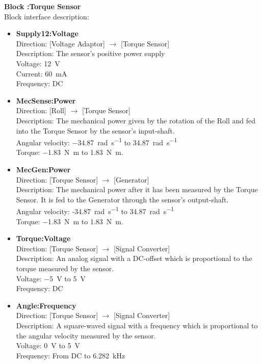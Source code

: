 \newpage
\textbf{Block :Torque Sensor}\\
Block interface description:
\begin{itemize}
	\item \textbf{Supply12:Voltage}\\
	Direction: [Voltage Adaptor] $\rightarrow$ [Torque Sensor]\\
	Description: The sensor's positive power supply\\
	Voltage: \SI{12}{\volt}\\
	Current: \SI{60}{\milli \ampere}\\
	Frequency: DC
	\item \textbf{MecSense:Power}\\
	Direction: [Roll] $\rightarrow$ [Torque Sensor]\\
	Description: The mechanical power given by the rotation of the Roll and fed into the Torque Sensor by the sensor's input-shaft.\\
	Angular velocity: \SI{-34.87}{\radian \per \second} to \SI{34.87}{\radian \per \second}\\
	Torque: \SI{-1.83}{\newton \meter} to \SI{1.83}{\newton \meter}.
	\item \textbf{MecGen:Power}\\
	Direction: [Torque Sensor] $\rightarrow$ [Generator]\\
	Description: The mechanical power after it has been measured by the Torque Sensor. It is fed to the Generator through the sensor's output-shaft.\\
	Angular velocity: -\SI{34.87}{\radian \per \second} to \SI{34.87}{\radian \per \second}\\
	Torque: \SI{-1.83}{\newton \meter} to \SI{1.83}{\newton \meter}.
	\item \textbf{Torque:Voltage}\\
	Direction: [Torque Sensor] $\rightarrow$ [Signal Converter]\\
	Description: An analog signal with a DC-offset which is proportional to the torque measured by the sensor.\\
	Voltage: \SI{-5}{\volt} to \SI{5}{\volt}\\
	Frequency: DC
	\item \textbf{Angle:Frequency}\\
	Direction: [Torque Sensor] $\rightarrow$ [Signal Converter]\\
	Description: A square-waved signal with a frequency which is proportional to the angular velocity measured by the sensor.\\
	Voltage: \SI{0}{\volt} to \SI{5}{\volt}\\
	Frequency: From DC to \SI{6.282}{\kilo \hertz}
\end{itemize}
							
